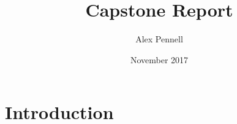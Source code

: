 \documentclass{article}
\title{Capstone Report}
\author{Alex Pennell}
\date{November 2017}
\begin{document}
\maketitle

\section{Introduction}
\end{document}
